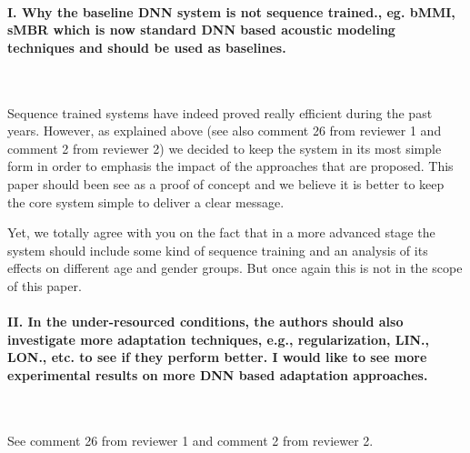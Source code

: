 \documentclass[]{article}
\begin{document}
\paragraph{I. Why the baseline DNN system is not sequence trained., eg. bMMI, sMBR which is now standard DNN based acoustic modeling techniques and should be used as baselines.}

~

Sequence trained systems have indeed proved really efficient during the past years. However, as explained above (see also comment 26 from reviewer 1 and comment 2 from reviewer 2) we decided to keep the system in its most simple form in order to emphasis the impact of the approaches that are proposed. This paper should been see as a proof of concept and we believe it is better to keep the core system simple to deliver a clear message. 

Yet, we totally agree with you on the fact that in a more advanced stage the system should include some kind of sequence training and an analysis of its effects on different age and gender groups. But once again this is not in the scope of this paper.
\paragraph{II. In the under-resourced conditions, the authors should also investigate more adaptation techniques, e.g., regularization, LIN., LON., etc. to see if they perform better. I would like to see more experimental results on more DNN based adaptation approaches.}

~

See comment 26 from reviewer 1 and comment 2 from reviewer 2.
\end{document}

